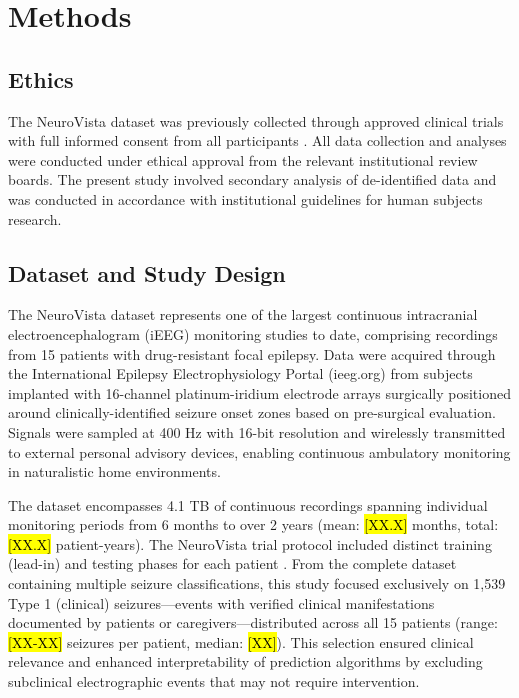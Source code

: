 

\section{Methods}

\subsection{Ethics}
The NeuroVista dataset was previously collected through approved clinical trials with full informed consent from all participants \cite{Kuhlmann2018SeizurePA}. All data collection and analyses were conducted under ethical approval from the relevant institutional review boards. The present study involved secondary analysis of de-identified data and was conducted in accordance with institutional guidelines for human subjects research.

\subsection{Dataset and Study Design}
The NeuroVista dataset \cite{Kuhlmann2018SeizurePA} represents one of the largest continuous intracranial electroencephalogram (iEEG) monitoring studies to date, comprising recordings from 15 patients with drug-resistant focal epilepsy. Data were acquired through the International Epilepsy Electrophysiology Portal (ieeg.org) from subjects implanted with 16-channel platinum-iridium electrode arrays surgically positioned around clinically-identified seizure onset zones based on pre-surgical evaluation. Signals were sampled at 400 Hz with 16-bit resolution and wirelessly transmitted to external personal advisory devices, enabling continuous ambulatory monitoring in naturalistic home environments.

The dataset encompasses 4.1 TB of continuous recordings spanning individual monitoring periods from 6 months to over 2 years (mean: \hl{[XX.X]} months, total: \hl{[XX.X]} patient-years). The NeuroVista trial protocol included distinct training (lead-in) and testing phases for each patient \cite{Freestone2015SeizurePSBF}. From the complete dataset containing multiple seizure classifications, this study focused exclusively on 1,539 Type 1 (clinical) seizures—events with verified clinical manifestations documented by patients or caregivers—distributed across all 15 patients (range: \hl{[XX-XX]} seizures per patient, median: \hl{[XX]}). This selection ensured clinical relevance and enhanced interpretability of prediction algorithms by excluding subclinical electrographic events that may not require intervention.

